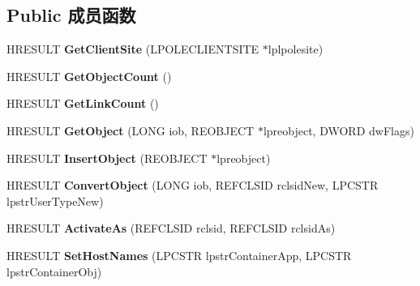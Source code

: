 \subsection*{Public 成员函数}
\begin{DoxyCompactItemize}
\item 
\mbox{\label{interface_i_rich_edit_ole_acd437bf817fe0805bc993626d2e99cb4}} 
H\+R\+E\+S\+U\+LT {\bfseries Get\+Client\+Site} (L\+P\+O\+L\+E\+C\+L\+I\+E\+N\+T\+S\+I\+TE $\ast$lplpolesite)
\item 
\mbox{\label{interface_i_rich_edit_ole_aaa39da624e62fef3703fbd76d377c5ee}} 
H\+R\+E\+S\+U\+LT {\bfseries Get\+Object\+Count} ()
\item 
\mbox{\label{interface_i_rich_edit_ole_ab0df7bf42f7ee508610582fc6791e117}} 
H\+R\+E\+S\+U\+LT {\bfseries Get\+Link\+Count} ()
\item 
\mbox{\label{interface_i_rich_edit_ole_a34c2779f02640641ae399bd420a73f6b}} 
H\+R\+E\+S\+U\+LT {\bfseries Get\+Object} (L\+O\+NG iob, R\+E\+O\+B\+J\+E\+CT $\ast$lpreobject, D\+W\+O\+RD dw\+Flags)
\item 
\mbox{\label{interface_i_rich_edit_ole_ab57a71d197d8df7f69b207cd0cc0c1a5}} 
H\+R\+E\+S\+U\+LT {\bfseries Insert\+Object} (R\+E\+O\+B\+J\+E\+CT $\ast$lpreobject)
\item 
\mbox{\label{interface_i_rich_edit_ole_a7f03180403614cc67a4bd0ed4b25e0fa}} 
H\+R\+E\+S\+U\+LT {\bfseries Convert\+Object} (L\+O\+NG iob, R\+E\+F\+C\+L\+S\+ID rclsid\+New, L\+P\+C\+S\+TR lpstr\+User\+Type\+New)
\item 
\mbox{\label{interface_i_rich_edit_ole_a69f6cdeeaec9fdc2c213da6fdaf8def5}} 
H\+R\+E\+S\+U\+LT {\bfseries Activate\+As} (R\+E\+F\+C\+L\+S\+ID rclsid, R\+E\+F\+C\+L\+S\+ID rclsid\+As)
\item 
\mbox{\label{interface_i_rich_edit_ole_a3b7e2063d8ebd49bd5e170ac6deca1bf}} 
H\+R\+E\+S\+U\+LT {\bfseries Set\+Host\+Names} (L\+P\+C\+S\+TR lpstr\+Container\+App, L\+P\+C\+S\+TR lpstr\+Container\+Obj)

\end{DoxyCompactItemize}
